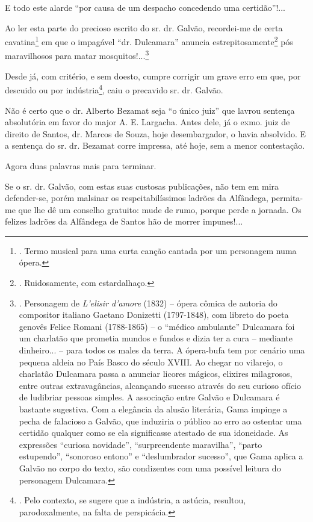 E todo este alarde ``por causa de um despacho concedendo uma
certidão''!...

Ao ler esta parte do precioso escrito do sr. dr. Galvão, recordei-me de
certa cavatina\footnote{. Termo musical para uma curta canção cantada
  por um personagem numa ópera.} em que o impagável ``dr. Dulcamara''
anuncia estrepitosamente\footnote{. Ruidosamente, com estardalhaço.} pós
maravilhosos para matar mosquitos!...\footnote{. Personagem de
  \emph{L'elisir d'amore} (1832) -- ópera cômica de autoria do
  compositor italiano Gaetano Donizetti (1797-1848), com libreto do
  poeta genovês Felice Romani (1788-1865) -- o ``médico ambulante''
  Dulcamara foi um charlatão que prometia mundos e fundos e dizia ter a
  cura -- mediante dinheiro... -- para todos os males da terra. A
  ópera-bufa tem por cenário uma pequena aldeia no País Basco do século
  XVIII. Ao chegar no vilarejo, o charlatão Dulcamara passa a anunciar
  licores mágicos, elixires milagrosos, entre outras extravagâncias,
  alcançando sucesso através do seu curioso ofício de ludibriar pessoas
  simples. A associação entre Galvão e Dulcamara é bastante sugestiva.
  Com a elegância da alusão literária, Gama impinge a pecha de falacioso
  a Galvão, que induziria o público ao erro ao ostentar uma certidão
  qualquer como se ela significasse atestado de sua idoneidade. As
  expressões ``curiosa novidade'', ``surpreendente maravilha'', ``parto
  estupendo'', ``sonoroso entono'' e ``deslumbrador sucesso'', que Gama
  aplica a Galvão no corpo do texto, são condizentes com uma possível
  leitura do personagem Dulcamara.}

Desde já, com critério, e sem doesto, cumpre corrigir um grave erro em
que, por descuido ou por indústria\footnote{. Pelo contexto, se sugere
  que a indústria, a astúcia, resultou, parodoxalmente, na falta de
  perspicácia.}, caiu o precavido sr. dr. Galvão.

Não é certo que o dr. Alberto Bezamat seja ``o único juiz'' que lavrou
sentença absolutória em favor do major A. E. Largacha. Antes dele, já o
exmo. juiz de direito de Santos, dr. Marcos de Souza, hoje
desembargador, o havia absolvido. E a sentença do sr. dr. Bezamat corre
impressa, até hoje, sem a menor contestação.

Agora duas palavras mais para terminar.

Se o sr. dr. Galvão, com estas suas custosas publicações, não tem em
mira defender-se, porém malsinar os respeitabilíssimos ladrões da
Alfândega, permita-me que lhe dê um conselho gratuito: mude de rumo,
porque perde a jornada. Os felizes ladrões da Alfândega de Santos hão de
morrer impunes!...

